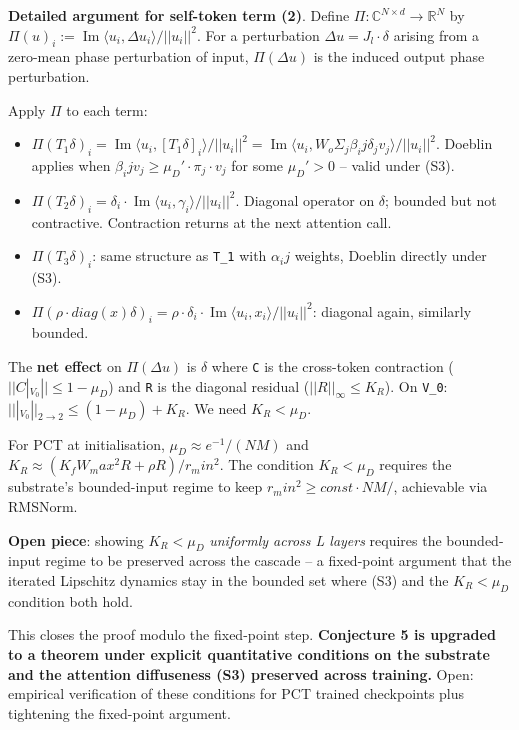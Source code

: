 \documentclass[11pt,a4paper]{article}
\theoremstyle{plain}
\theoremstyle{definition}
\renewcommand{\Im}{\operatorname{Im}}
\begin{document}
\textbf{Detailed argument for self-token term (2)}. Define $\Pi  : \mathbb{C}^{N\times d} \to  \mathbb{R}^N$ by $\Pi (u)_i := \Im \langle u_i, \Delta u_i\rangle  / ||u_i||^2$. For a perturbation $\Delta u = J_l \cdot  \delta $ arising from a zero-mean phase perturbation of input, $\Pi (\Delta u)$ is the induced output phase perturbation.

Apply $\Pi $ to each term:

\begin{itemize}
  \item $\Pi (T_1 \delta )_i = \Im \langle u_i, [T_1 \delta ]_i\rangle  / ||u_i||^2 = \Im \langle u_i, W_o \Sigma _j \beta _ij \delta _j v_j\rangle  / ||u_i||^2$. Doeblin applies when $\beta _ij v_j \ge  \mu _D' \cdot  \pi _j \cdot  v_j$ for some $\mu _D' > 0$ -- valid under (S3).
  \item $\Pi (T_2 \delta )_i = \delta _i \cdot  \Im \langle u_i, \gamma _i\rangle  / ||u_i||^2$. Diagonal operator on $\delta $; bounded but not contractive. Contraction returns at the next attention call.
  \item $\Pi (T_3 \delta )_i$: same structure as \texttt{T\_1} with $\alpha _ij$ weights, Doeblin directly under (S3).
  \item $\Pi (\rho  \cdot  diag(x) \delta )_i = \rho  \cdot  \delta _i \cdot  \Im \langle u_i, x_i\rangle  / ||u_i||^2$: diagonal again, similarly bounded.
\end{itemize}

The \textbf{net effect} on $\Pi (\Delta u)$ is $ \delta $ where \texttt{C} is the cross-token contraction ($||C|_{V_0}|| \le  1 - \mu _D$) and \texttt{R} is the diagonal residual ($||R||_\infty  \le  K_R$). On \texttt{V\_0}: $|||_{V_0}||_{2 \to  2} \le  (1 - \mu _D) + K_R$. We need $K_R < \mu _D$.

For PCT at initialisation, $\mu _D \approx  e^{-1}/(N M)$ and $K_R \approx  (K_f W_max^2 R + \rho  R) / r_min^2$. The condition $K_R < \mu _D$ requires the substrate's bounded-input regime to keep $r_min^2 \ge  const \cdot  N M /$, achievable via RMSNorm.

\textbf{Open piece}: showing $K_R < \mu _D$ \emph{uniformly across L layers} requires the bounded-input regime to be preserved across the cascade -- a fixed-point argument that the iterated Lipschitz dynamics stay in the bounded set where (S3) and the $K_R < \mu _D$ condition both hold.

This closes the proof modulo the fixed-point step. \textbf{Conjecture 5 is upgraded to a theorem under explicit quantitative conditions on the substrate and the attention diffuseness (S3) preserved across training.} Open: empirical verification of these conditions for PCT trained checkpoints plus tightening the fixed-point argument.

\medskip
\end{document}
